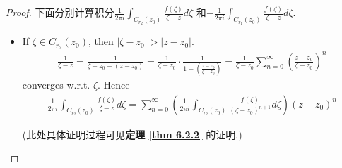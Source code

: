 \begin{thm}
\begin{proof}
		\vspace{2em}
		下面分别计算积分$\frac{1}{2 \pi i} \int_{C_{r_2}(z_0)}{\frac{f(\zeta)}{\zeta - z} d\zeta}$ 和$-\frac{1}{2 \pi i} \int_{C_{r_1}(z_0)}{\frac{f(\zeta)}{\zeta - z} d\zeta}$.
		\begin{itemize}
			\item If $\zeta \in C_{r_2}(z_0)$, then $\left| \zeta - z_0 \right| > \left| z - z_0 \right|$.
			\begin{align}
				\frac{1}{\zeta - z} 
				= \frac{1}{\zeta - z_0 - (z - z_0)} 
				= \frac{1}{\zeta - z_0} \cdot \frac{1}{1 - \left( \frac{z - z_0}{\zeta - z_0} \right)}
				= \frac{1}{\zeta - z_0} \sum_{n = 0}^{\infty}{\left( \frac{z - z_0}{\zeta - z_0} \right)^n}
			\end{align}
			converges  w.r.t. $\zeta$. Hence
			\begin{align}
				\frac{1}{2\pi i} \int_{C_{r_2}(z_0)}{\frac{f(\zeta)}{\zeta - z} d\zeta}
				= \sum_{n = 0}^{\infty}{\left( \frac{1}{2 \pi i} \int_{C_{r_2}(z_0)}{\frac{f(\zeta)}{(\zeta - z_0)^{n + 1} } d\zeta } \right) (z - z_0)^n}
			\end{align}
			\begin{center}
				(此处具体证明过程可见\textbf{定理 \ref{thm 6.2.2}} 的证明.)
			\end{center}
			
			\vspace{1em}
			

\end{itemize}
\end{proof}
\end{thm}
